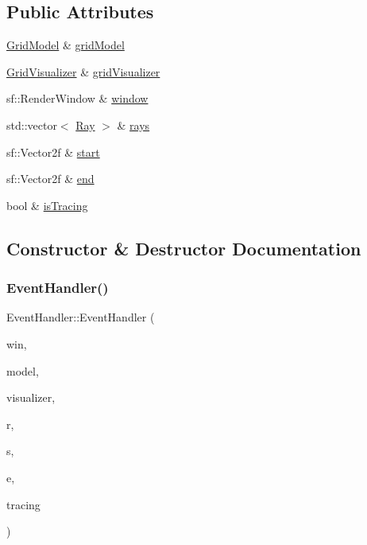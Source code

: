 \subsection*{Public Attributes}
\begin{DoxyCompactItemize}
\item 
\hyperlink{classGridModel}{Grid\+Model} \& \hyperlink{classEventHandler_a8506f29d8603dd90e1d37f17d6d6c021}{grid\+Model}
\item 
\hyperlink{classGridVisualizer}{Grid\+Visualizer} \& \hyperlink{classEventHandler_a09d4bc33ad5c675279836874f0829fb6}{grid\+Visualizer}
\item 
sf\+::\+Render\+Window \& \hyperlink{classEventHandler_a6dd0cfdf4535ff9aadafd17823d28709}{window}
\item 
std\+::vector$<$ \hyperlink{classRay}{Ray} $>$ \& \hyperlink{classEventHandler_a9e4621f4e9ba394724a6f5b985a24a19}{rays}
\item 
sf\+::\+Vector2f \& \hyperlink{classEventHandler_a119a7b2db4b9a47de6e73126910658f9}{start}
\item 
sf\+::\+Vector2f \& \hyperlink{classEventHandler_ae41932d1526dd69b958add468b0fe785}{end}
\item 
bool \& \hyperlink{classEventHandler_a40629d2cc6371262fcf1e9fd5abb8f07}{is\+Tracing}
\end{DoxyCompactItemize}


\subsection{Constructor \& Destructor Documentation}
\mbox{\label{classEventHandler_a37e139e7fb6fcbc58b52aafb1974fb2f}} 
\subsubsection{\texorpdfstring{Event\+Handler()}{EventHandler()}}
{\footnotesize\ttfamily Event\+Handler\+::\+Event\+Handler (\begin{DoxyParamCaption}\item[{sf\+::\+Render\+Window \&}]{win,  }\item[{\hyperlink{classGridModel}{Grid\+Model} \&}]{model,  }\item[{\hyperlink{classGridVisualizer}{Grid\+Visualizer} \&}]{visualizer,  }\item[{std\+::vector$<$ \hyperlink{classRay}{Ray} $>$ \&}]{r,  }\item[{sf\+::\+Vector2f \&}]{s,  }\item[{sf\+::\+Vector2f \&}]{e,  }\item[{bool \&}]{tracing }\end{DoxyParamCaption})\hspace{0.3cm}{\ttfamily [inline]}}



